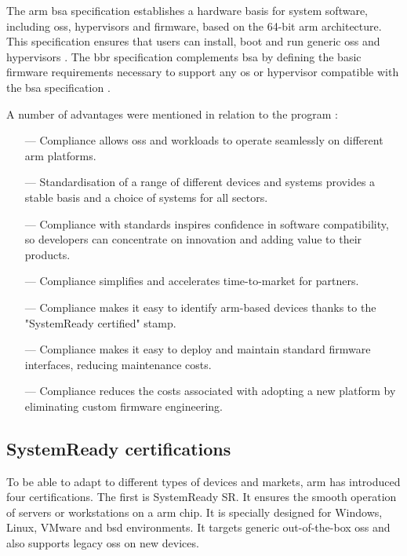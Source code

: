The \gls{arm} \acrshort{bsa} specification establishes a hardware basis for system software, including \acrshort{os}s, hypervisors and firmware, based on the 64-bit \gls{arm} architecture. This specification ensures that users can install, boot and run generic \acrshort{os}s and hypervisors \cite{bsa_standard}. The \acrshort{bbr} specification complements \acrshort{bsa} by defining the basic firmware requirements necessary to support any \acrshort{os} or hypervisor compatible with the \acrshort{bsa} specification \cite{bbr_standard}.

A number of advantages were mentioned in relation to the program \cite{systemready_program}:
\begin{itemize}
    \item[—] Compliance allows \acrshort{os}s and workloads to operate seamlessly on different \gls{arm} platforms.
    \item[—] Standardisation of a range of different devices and systems provides a stable basis and a choice of systems for all sectors.
    \item[—] Compliance with standards inspires confidence in software compatibility, so developers can concentrate on innovation and adding value to their products.
    \item[—] Compliance simplifies and accelerates time-to-market for partners.
    \item[—] Compliance makes it easy to identify \gls{arm}-based devices thanks to the "SystemReady certified" stamp.
    \item[—] Compliance makes it easy to deploy and maintain standard firmware interfaces, reducing maintenance costs.
    \item[—] Compliance reduces the costs associated with adopting a new platform by eliminating custom firmware engineering.
\end{itemize}

\subsection{SystemReady certifications}
To be able to adapt to different types of devices and markets, \gls{arm} has introduced four certifications. The first is SystemReady SR. It ensures the smooth operation of servers or workstations on a \gls{arm} chip. It is specially designed for Windows, Linux, VMware and \acrfull{bsd} environments. It targets generic out-of-the-box \acrshort{os}s and also supports legacy \acrshort{os}s on new devices. \cite{systemready_program}

